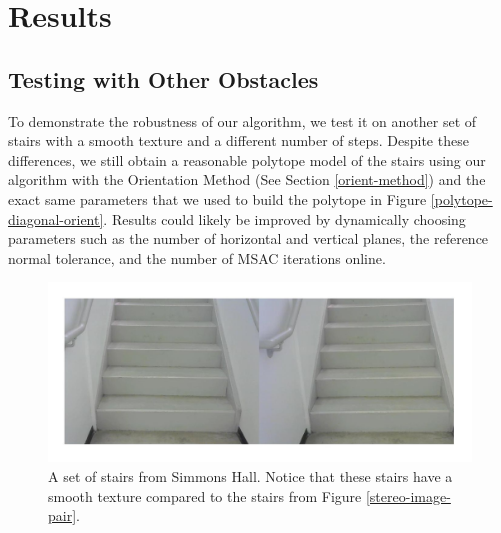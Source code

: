 
\section{Results}

\subsection{Testing with Other Obstacles}

To demonstrate the robustness of our algorithm, we test it on another set of stairs with a smooth texture and a different number of steps. Despite these differences, we still obtain a reasonable polytope model of the stairs using our algorithm with the Orientation Method (See Section \ref{orient-method}) and the exact same parameters that we used to build the polytope in Figure \ref{polytope-diagonal-orient}. Results could likely be improved by dynamically choosing parameters such as the number of horizontal and vertical planes, the reference normal tolerance, and the number of MSAC iterations online.

\begin{figure}[!h]
\centering
\includegraphics[width=\columnwidth]{Sections/Figures/simmons-stereo-pair.jpg}
\caption{A set of stairs from Simmons Hall. Notice that these stairs have a smooth texture compared to the stairs from Figure \ref{stereo-image-pair}.}
\label{simmons-pair}
\end{figure}

